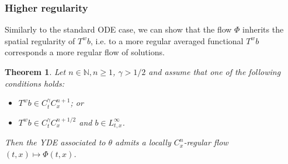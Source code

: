 \documentclass[10pt]{article}
\newtheorem{theorem}{Theorem}
\begin{document}
\subsubsection{Higher regularity}\label{sec4.3.2}

Similarly to the standard ODE case, we can show that the flow $\Phi$ inherits
the spatial regularity of $T^w b$, i.e. to a more regular averaged functional
$T^w b$ corresponds a more regular flow of solutions.

\begin{theorem}
  \label{sec4.3 thm higher regularity}Let $n \in \mathbb{N}, n \geqslant 1$,
  $\gamma > 1 / 2$ and assume that one of the following conditions holds:
  \begin{itemize}
    \item $T^w b \in C^{\gamma}_t C^{n + 1}_x$; or
    
    \item $T^w b \in C^{\gamma}_t C^{n + 1 / 2}_x$ and $b \in L^{\infty}_{t,
    x}$.
  \end{itemize}
  Then the YDE associated to $\theta$ admits a locally $C^n_x$-regular flow
  $(t, x) \mapsto \Phi (t, x)$.
\end{theorem}
\end{document}

